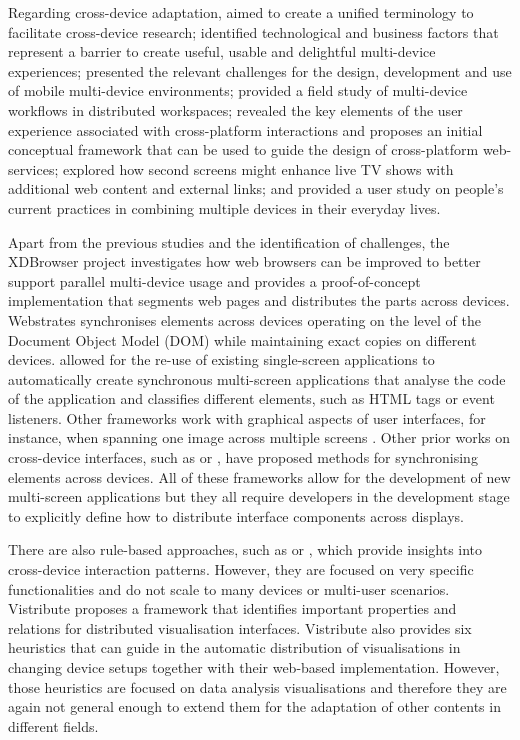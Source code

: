Regarding cross-device adaptation, \cite{brudy2019cross} aimed to create a unified terminology to facilitate cross-device research; \cite{dong2016understanding} identified technological and business factors that represent a barrier to create useful, usable and delightful multi-device experiences; \cite{grubert2016challenges} presented the relevant challenges for the design, development and use of mobile multi-device environments; \cite{santosa2013field} provided a field study of multi-device workflows in distributed workspaces; \cite{waljas2010cross} revealed the key elements of the user experience associated with cross-platform interactions and proposes an initial conceptual framework that can be used to guide the design of cross-platform web-services; \cite{bbcExp} explored how second screens might enhance live TV shows with additional web content and external links; and \cite{jokela2015diary} provided a user study on people's current practices in combining multiple devices in their everyday lives. 

Apart from the previous studies and the identification of challenges, the XDBrowser \cite{nebeling2017xdbrowser} \cite{nebeling2016xdbrowser} project investigates how web browsers can be improved to better support parallel multi-device usage and provides a proof-of-concept implementation that segments web pages and distributes the parts across devices. Webstrates \cite{klokmose2015webstrates} synchronises elements across devices operating on the level of the Document Object Model (DOM) while maintaining exact copies on different devices. \cite{sarkis2018multi} allowed for the re-use of existing single-screen applications to automatically create synchronous multi-screen applications that analyse the code of the application and classifies different elements, such as HTML tags or event listeners. Other frameworks work with graphical aspects of user interfaces, for instance, when spanning one image across multiple screens \cite{radle2014huddlelamp} \cite{schreiner2015connichiwa}. Other prior works on cross-device interfaces, such as \cite{frosini2014user} or \cite{yang2014panelrama}, have proposed methods for synchronising elements across devices. All of these frameworks allow for the development of new multi-screen applications but they all require developers in the development stage to explicitly define how to distribute interface components across displays.

There are also rule-based approaches, such as \cite{husmann2017orchestrating} or \cite{nebeling2017xdbrowser}, which provide insights into cross-device interaction patterns. However, they are focused on very specific functionalities and do not scale to many devices or multi-user scenarios. Vistribute \cite{horak2019vistribute} proposes a framework that identifies important properties and relations for distributed visualisation interfaces. Vistribute also provides six heuristics that can guide in the automatic distribution of visualisations in changing device setups together with their web-based implementation. However, those heuristics are focused on data analysis visualisations and therefore they are again not general enough to extend them for the adaptation of other contents in different fields.

